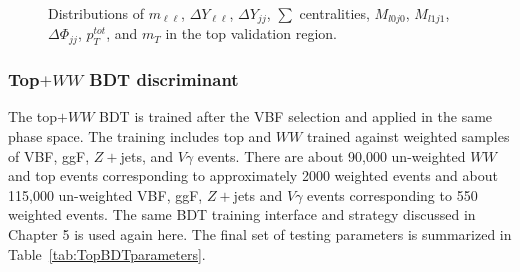 \begin{figure}[!h]
{  }\hfill
  \hfill
  \hfill
{\caption{Distributions of $m_{\ell\ell}$, $\Delta Y_{\ell\ell}$, $\Delta Y_{jj}$, $\sum$ centralities, $M_{l0j0}$, $M_{l1j1}$, $\Delta\Phi_{jj}$, $p_T^{tot}$, and $m_T$ in the top validation region.
\label{fig:TopCR3}}}
\end{figure}

\subsubsection{Top$+WW$ BDT discriminant}

The top$+WW$ BDT is trained after the VBF selection and applied in the same phase space. The training includes top and $WW$ trained against weighted samples of VBF, ggF, $Z+$jets, and $V\gamma$ events. There are about 90,000 un-weighted $WW$ and top events corresponding to approximately 2000 weighted events and about 115,000 un-weighted VBF, ggF, $Z+$jets and $V\gamma$ events corresponding to 550 weighted events. The same BDT training interface and strategy discussed in Chapter 5 is used again here. The final set of testing parameters is summarized in Table~\ref{tab:TopBDTparameters}.

